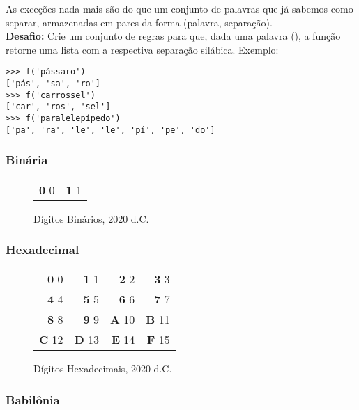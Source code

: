 \documentclass[12pt]{article}
\begin{document}
	As exceções nada mais são do que um conjunto de palavras que já sabemos como separar, armazenadas em pares da forma (palavra, separação).\\
	
	\textbf{Desafio:} Crie um conjunto de regras para que, dada uma palavra (), a função retorne uma lista com a respectiva separação silábica. Exemplo:
	
	\begin{lstlisting}[caption="Separando sílabas"]
>>> f('pássaro')
['pás', 'sa', 'ro']
>>> f('carrossel')
['car', 'ros', 'sel']
>>> f('paralelepípedo')
['pa', 'ra', 'le', 'le', 'pí', 'pe', 'do']
	\end{lstlisting}
	
	
	\subsubsection*{Binária}
	
	\begin{figure}[H]
	\centering
	\begin{tabular}{rr}
	\textbf{0} \phantom{0}0 & \textbf{1} \phantom{0}1
	\end{tabular}
	\caption{Dígitos Binários, 2020 d.C.}
	\end{figure}
	
	\subsubsection*{Hexadecimal}
	
	\begin{figure}[H]
	\centering
	\begin{tabular}{rrrr}
	\textbf{0} \phantom{1}0 & \textbf{1} \phantom{1}1 & \textbf{2} \phantom{1}2 & \textbf{3} \phantom{1}3\\
	\textbf{4} \phantom{1}4 & \textbf{5} \phantom{1}5 & \textbf{6} \phantom{1}6 & \textbf{7} \phantom{1}7\\
	\textbf{8} \phantom{1}8 & \textbf{9} \phantom{1}9 & \textbf{A} 10 & \textbf{B} 11\\
	\textbf{C} 12 & \textbf{D} 13 & \textbf{E} 14 & \textbf{F} 15
	\end{tabular}
	\caption{Dígitos Hexadecimais, 2020 d.C.}
	\end{figure}
			
	
	\subsubsection*{Babilônia}
	
\end{document}
